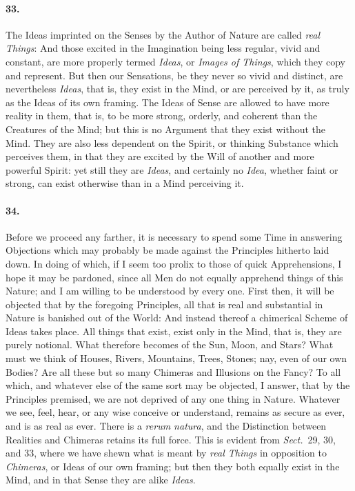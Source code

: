 \documentclass[]{article}
\newenvironment{sectionbody}{\begin{multicols}{2}}{\end{multicols}}
\begin{document}
\begin{sectionbody}
\paragraph{33.} The Ideas imprinted on the Senses by the Author of Nature are
called \emph{real Things}: And those excited in the Imagination
being less regular, vivid and constant, are more properly termed
\emph{Ideas}, or \emph{Images of Things}, which they copy and
represent.  But then our Sensations, be they never so vivid and
distinct, are nevertheless \emph{Ideas}, that is, they exist in
the Mind, or are perceived by it, as truly as the Ideas of its
own framing.  The Ideas of Sense are allowed to have more reality
in them, that is, to be more strong, orderly, and coherent than
the Creatures of the Mind; but this is no Argument that they
exist without the Mind.  They are also less dependent on the
Spirit, or thinking Substance which perceives them, in that they
are excited by the Will of another and more powerful Spirit: yet
still they are \emph{Ideas}, and certainly no \emph{Idea},
whether faint or strong, can exist otherwise than in a Mind
perceiving it.



\paragraph{34.} Before we proceed any farther, it is necessary to spend some Time
in answering Objections which may probably be made against the
Principles hitherto laid down.  In doing of which, if I seem too
prolix to those of quick Apprehensions, I hope it may be
pardoned, since all Men do not equally apprehend things of this
Nature; and I am willing to be understood by every one.  First
then, it will be objected that by the foregoing Principles, all
that is real and substantial in Nature is banished out of the
World: And instead thereof a chimerical Scheme of Ideas takes
place.  All things that exist, exist only in the Mind, that is,
they are purely notional.  What therefore becomes of the Sun,
Moon, and Stars?  What must we think of Houses, Rivers,
Mountains, Trees, Stones; nay, even of our own Bodies? Are all
these but so many Chimeras and Illusions on the Fancy? To all
which, and whatever else of the same sort may be objected, I
answer, that by the Principles premised, we are not deprived of
any one thing in Nature.  Whatever we see, feel, hear, or any
wise conceive or understand, remains as secure as ever, and is as
real as ever.  There is a \emph{rerum natura}, and the
Distinction between Realities and Chimeras retains its full
force.  This is evident from
\emph{Sect.}\ 29, 30, and 33,
where we have shewn what is meant by
\emph{real Things} in opposition to \emph{Chimeras}, or Ideas
of our own framing; but then they both equally exist in the Mind,
and in that Sense they are alike \emph{Ideas}.




\end{sectionbody}
\end{document}
